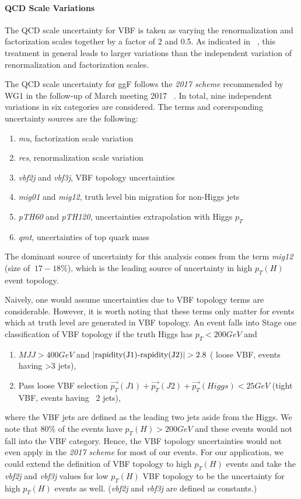 \paragraph{QCD Scale Variations}

The QCD scale uncertainty for VBF is taken as varying the renormalization
and factorization scales together by a factor of 2 and 0.5. As indicated in ~\cite{QCDscale_vbf}, 
this treatment in general leads to larger variations than the independent variation of renormalization
and factorization scales. 

The QCD scale uncertainty for ggF follows the \textit{2017 scheme} recommended by 
WG1 in the follow-up of March meeting 2017 ~\cite{QCDscale_ggF}. In total, nine independent 
variations in six categories are considered. The terms and corersponding uncertainty sources 
are the following:

\begin{enumerate}
\item \textit{mu}, factorization scale variation
\item \textit{res}, renormalization scale variation
\item \textit{vbf2j} and \textit{vbf3j}, VBF topology uncertainties
\item \textit{mig01} and \textit{mig12}, truth level bin migration for non-Higgs jets
\item \textit{pTH60} and \textit{pTH120}, uncertainties extrapolation with Higgs $p_T$
\item \textit{qmt}, uncertainties of top quark mass
\end{enumerate}

The dominant source of uncertainty for this analysis comes from the term \textit{mig12} (size of $~17-18\%$), 
which is the leading source of uncertainty in high $p_T(H)$ event topology. 

Naively, one would assume uncertainties due to VBF topology terms are considerable. 
However, it is worth noting that these terms only matter for events which 
at truth level are generated in VBF topology. An event falls into Stage one classification 
of VBF topology if the truth Higgs has $p_T<200GeV$ and 
\begin{enumerate}
\item $MJJ>400 GeV$ and $|\textnormal{rapidity(J1)-rapidity(J2)}|>2.8$ ( loose VBF, events having >3 jets),
\item Pass loose VBF selection $\overrightarrow{p_{T}}(J1)+\overrightarrow{p_{T}}(J2)+\overrightarrow{p_{T}}(Higgs)<25GeV$ (tight VBF, events having ~2 jets),
\end{enumerate}
where the VBF jets are defined as the leading two jets aside from the Higgs. We note that $80\%$ of the events have $p_T(H)>200GeV$ and 
these events would not fall into the VBF category. Hence, the VBF topology uncertainties would not even apply in the \textit{2017 scheme} for most of our events. 
For our application, we could extend the definition of VBF topology to high $p_T(H)$ events and take the \textit{vbf2j} and \textit{vbf3j} values
for low $p_T(H)$ VBF topology to be the uncertainty for high $p_T(H)$ events as well. (\textit{vbf2j} and \textit{vbf3j} are defined as constants.)

